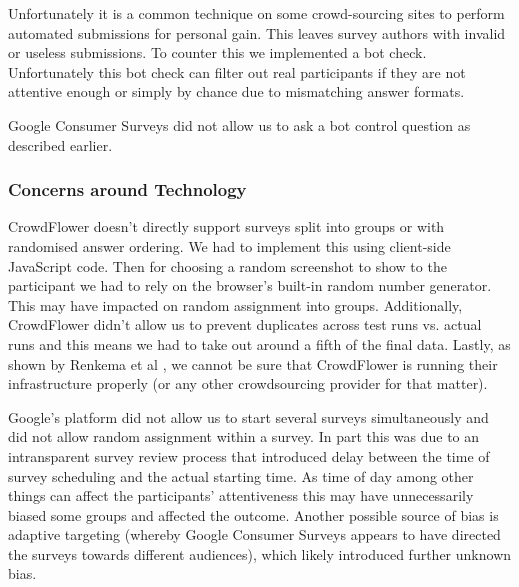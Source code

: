 \documentclass[twoside,letterpaper]{soups}
\begin{document}




Unfortunately it is a common technique on some crowd-sourcing sites to perform automated submissions for personal gain. This leaves survey authors with invalid or useless submissions. To counter this we implemented a bot check. Unfortunately this bot check can filter out real participants if they are not attentive enough or simply by chance due to mismatching answer formats.

Google Consumer Surveys did not allow us to ask a bot control question as described earlier.

\subsubsection{Concerns around Technology}

CrowdFlower doesn't directly support surveys split into groups or with randomised answer ordering. We had to implement this using client-side JavaScript code. Then for choosing a random screenshot to show to the participant we had to rely on the browser's built-in random number generator. This may have impacted on random assignment into groups. %
Additionally, CrowdFlower didn't allow us to prevent duplicates across test runs vs. actual runs and this means we had to take out around a fifth of the final data.
Lastly, as shown by Renkema et al \cite{renkema2014buildling}, we cannot be sure that CrowdFlower is running their infrastructure properly (or any other crowdsourcing provider for that matter).

Google's platform did not allow us to start several surveys simultaneously and did not allow random assignment within a survey. %
In part this was due to an intransparent survey review process that introduced delay between the time of survey scheduling and the actual starting time. As time of day among other things can affect the participants' attentiveness this may have unnecessarily biased some groups and affected the outcome. Another possible source of bias is adaptive targeting (whereby Google Consumer Surveys appears to have directed the surveys towards different audiences), which likely introduced further unknown bias. %
\end{document}
